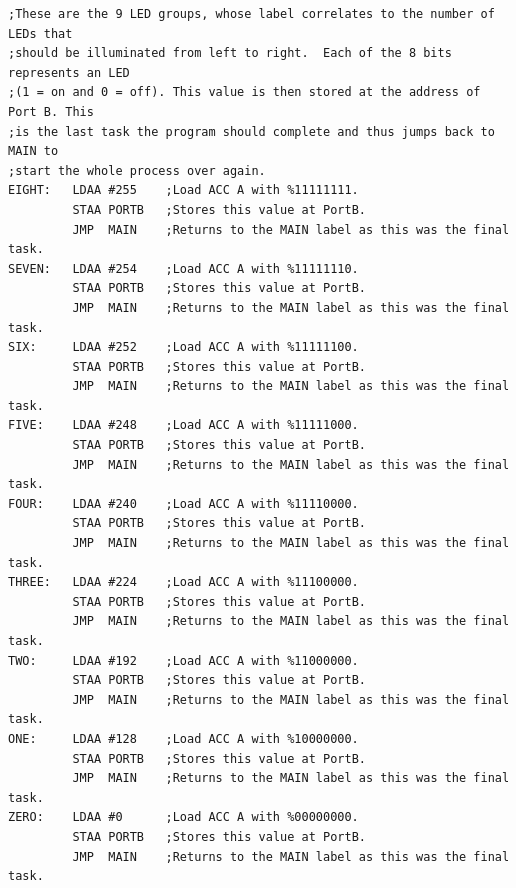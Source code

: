 \documentclass[12pt]{report}
\begin{document}
\begin{Verbatim}[frame=single, fontsize=\small]
;These are the 9 LED groups, whose label correlates to the number of LEDs that
;should be illuminated from left to right.  Each of the 8 bits represents an LED
;(1 = on and 0 = off). This value is then stored at the address of Port B. This
;is the last task the program should complete and thus jumps back to MAIN to
;start the whole process over again.
EIGHT:   LDAA #255    ;Load ACC A with %11111111.
         STAA PORTB   ;Stores this value at PortB.
         JMP  MAIN    ;Returns to the MAIN label as this was the final task.
SEVEN:   LDAA #254    ;Load ACC A with %11111110.
         STAA PORTB   ;Stores this value at PortB.
         JMP  MAIN    ;Returns to the MAIN label as this was the final task.
SIX:     LDAA #252    ;Load ACC A with %11111100.
         STAA PORTB   ;Stores this value at PortB.
         JMP  MAIN    ;Returns to the MAIN label as this was the final task.
FIVE:    LDAA #248    ;Load ACC A with %11111000.
         STAA PORTB   ;Stores this value at PortB.
         JMP  MAIN    ;Returns to the MAIN label as this was the final task.
FOUR:    LDAA #240    ;Load ACC A with %11110000.
         STAA PORTB   ;Stores this value at PortB.
         JMP  MAIN    ;Returns to the MAIN label as this was the final task.
THREE:   LDAA #224    ;Load ACC A with %11100000.
         STAA PORTB   ;Stores this value at PortB.
         JMP  MAIN    ;Returns to the MAIN label as this was the final task.
TWO:     LDAA #192    ;Load ACC A with %11000000.
         STAA PORTB   ;Stores this value at PortB.
         JMP  MAIN    ;Returns to the MAIN label as this was the final task.
ONE:     LDAA #128    ;Load ACC A with %10000000.
         STAA PORTB   ;Stores this value at PortB.
         JMP  MAIN    ;Returns to the MAIN label as this was the final task.
ZERO:    LDAA #0      ;Load ACC A with %00000000.
         STAA PORTB   ;Stores this value at PortB.
         JMP  MAIN    ;Returns to the MAIN label as this was the final task.


\end{Verbatim}
\end{document}

